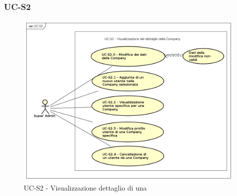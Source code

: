 \subsubsection{UC-S2}
    \begin{figure}[H]
      \begin{center}
        \includegraphics[width=12cm]{res/img/UCSuperadmin/UC-S2.png}
      \caption{UC-S2 - Visualizzazione dettaglio di una }
      \end{center} 
    \end{figure}    
    
